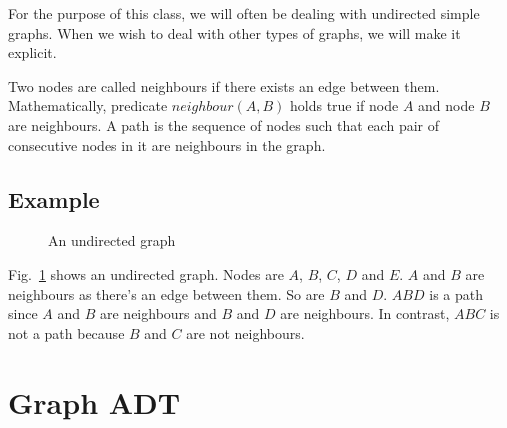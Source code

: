 \documentclass[12pt,a4paper]{article}
\begin{document}
For the purpose of this class, we will often be dealing with undirected simple graphs. When we wish to deal with other types of graphs, we will make it explicit.

Two nodes are called neighbours if there exists an edge between them. Mathematically, predicate $neighbour(A,B)$ holds true if node $A$ and node $B$ are neighbours. A path is the sequence of nodes such that each pair of consecutive nodes in it are neighbours in the graph.
 
\subsection*{Example}
\begin{figure}[H]
\begin{center}
\end{center}
\caption{An undirected graph}
\label{f:ug}
\end{figure}

Fig.~\ref{f:ug} shows an undirected graph. Nodes are $A$, $B$, $C$, $D$ and $E$. $A$ and $B$ are neighbours as there's an edge between them. So are $B$ and $D$.
$ABD$ is a path since $A$ and $B$ are neighbours and $B$ and $D$ are neighbours. In contrast, $ABC$ is not a path because $B$ and $C$ are not neighbours.


\section{Graph ADT}
\end{document}
